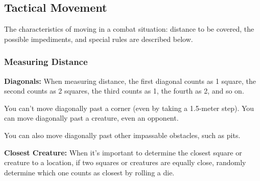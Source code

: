 \subsection{Tactical Movement}
The characteristics of moving in a combat situation: distance to be covered, the possible impediments, and special rules are described below.




\subsubsection{Measuring Distance}
\textbf{Diagonals:} When measuring distance, the first diagonal counts as 1 square, the second counts as 2 squares, the third counts as 1, the fourth as 2, and so on.

You can't move diagonally past a corner (even by taking a 1.5-meter step). You can move diagonally past a creature, even an opponent.

You can also move diagonally past other impassable obstacles, such as pits.

\textbf{Closest Creature:} When it's important to determine the closest square or creature to a location, if two squares or creatures are equally close, randomly determine which one counts as closest by rolling a die.



